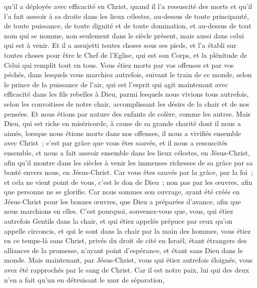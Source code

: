 \begin{multicols}{2}
qu'il a déployée avec efficacité en Christ, quand il l'a ressuscité des morts et qu'il l'a fait asseoir à sa droite dans les lieux célestes,
au-dessus de toute principauté, de toute puissance, de toute dignité et de toute domination, et au-dessus de tout nom qui se nomme, non seulement dans le siècle présent, mais aussi dans celui qui est à venir.
Et il a assujetti toutes choses sous ses pieds, et l'a établi sur toutes choses pour être le Chef de l'Eglise,
qui est son Corps, et la plénitude de Celui qui remplit tout en tous.
\VerseOne{}Vous étiez morts par vos offenses et par vos péchés,
dans lesquels vous marchiez autrefois, suivant le train de ce monde, selon le prince de la puissance de l'air, qui est l'esprit qui agit maintenant avec efficacité dans les fils rebelles à Dieu,
parmi lesquels nous vivions tous autrefois, selon les convoitises de notre chair, accomplissant les désirs de la chair et de nos pensées. Et nous étions par nature des enfants de colère, comme les autres.
Mais Dieu, qui est riche en miséricorde, à cause de sa grande charité dont il nous a aimés,
lorsque nous étions morts dans nos offenses, il nous a vivifiés ensemble avec Christ~; c'est par grâce que vous êtes sauvés,
et il nous a ressuscités ensemble, et nous a fait asseoir ensemble dans les lieux célestes, en Jésus-Christ,
afin qu'il montre dans les siècles à venir les immenses richesses de sa grâce par sa bonté envers nous, en Jésus-Christ.
Car vous êtes sauvés par la grâce, par la foi~; et cela ne vient point de vous, c'est le don de Dieu~;
non pas par les œuvres, afin que personne ne se glorifie.
Car nous sommes son ouvrage, ayant été créés en Jésus-Christ pour les bonnes œuvres, que Dieu a préparées d'avance, afin que nous marchions en elles.
C'est pourquoi, souvenez-vous que, vous, qui étiez autrefois Gentils dans la chair, et qui étiez appelés prépuce par ceux qu'on appelle circoncis, et qui le sont dans la chair par la main des hommes, 
vous étiez en ce temps-là sans Christ, privés du droit de cité en Israël, étant étrangers des alliances de la promesse, n'ayant point d'espérance, et étant sans Dieu dans le monde.
Mais maintenant, par Jésus-Christ, vous qui étiez autrefois éloignés, vous avez été rapprochés par le sang de Christ.
Car il est notre paix, lui qui des deux n'en a fait qu'un en détruisant le mur de séparation,

\end{multicols}
